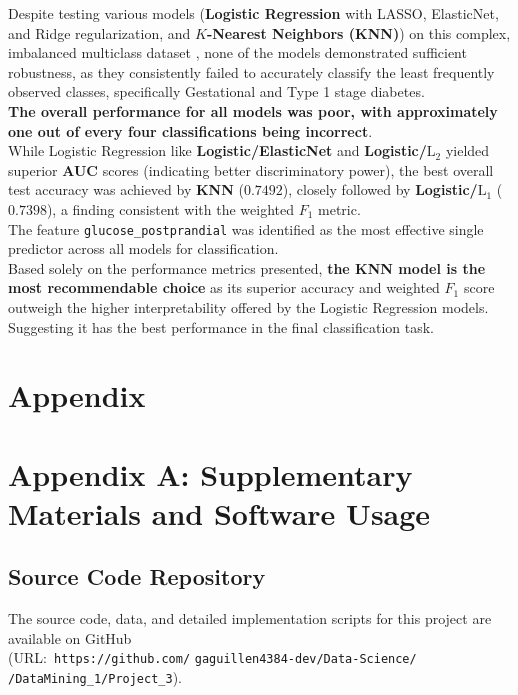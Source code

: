 \documentclass[conference]{IEEEtran}
\begin{document}
\indent Despite testing various models (\textbf{Logistic Regression} with LASSO, ElasticNet, and Ridge regularization, and \textbf{$K$-Nearest Neighbors (KNN)}) on this complex, imbalanced multiclass dataset \cite{rakesh_kolipaka_ranjith_kumar_digutla_2025}, none of the models demonstrated sufficient robustness, as they consistently failed to accurately classify the least frequently observed classes, specifically Gestational and Type 1 stage diabetes.\\
\indent \textbf{The overall performance for all models was poor, with approximately one out of every four classifications being incorrect}.\\
\indent While Logistic Regression like \textbf{Logistic/ElasticNet} and \textbf{Logistic/$\text{L}_2$} yielded superior \textbf{AUC} scores (indicating better discriminatory power), the best overall test accuracy was achieved by \textbf{KNN} ($\mathbf{0.7492}$), closely followed by \textbf{Logistic/$\text{L}_1$} ($\mathbf{0.7398}$), a finding consistent with the weighted $F_1$ metric.\\
\indent The feature \texttt{glucose\_postprandial} was identified as the most effective single predictor across all models for classification.\\
\indent Based solely on the performance metrics presented, \textbf{the KNN model is the most recommendable choice} as its superior accuracy and weighted $F_1$ score outweigh the higher interpretability offered by the Logistic Regression models. Suggesting it has the best performance in the final classification task.

\section*{\textbf{Appendix}}
	
\section*{Appendix A: Supplementary Materials and Software Usage}
\subsection*{Source Code Repository \label{app:code}}
The source code, data, and detailed implementation scripts for this project are available on GitHub \\
(URL:\texttt{ https://github.com/}
\texttt{gaguillen4384-dev/Data-Science/} \\
\texttt{/DataMining\_1/Project\_3}).
\\
\end{document}
